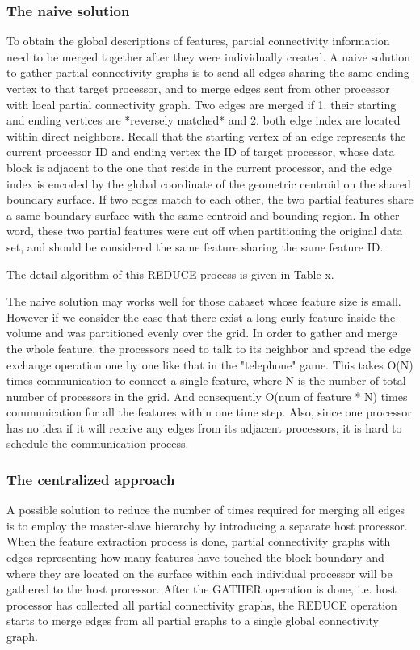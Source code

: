 \documentclass[10pt, conference, compsocconf]{IEEEtran}
\begin{document}
\subsubsection{The naive solution}

To obtain the global descriptions of features, partial connectivity information need to be merged together after they were individually created. A naive solution to gather partial connectivity graphs is to send all edges sharing the same ending vertex to that target processor, and to merge edges sent from other processor with local partial connectivity graph. Two edges are merged if 1. their starting and ending vertices are *reversely matched* and 2. both edge index are located within direct neighbors. Recall that the starting vertex of an edge represents the current processor ID and ending vertex the ID of target processor, whose data block is adjacent to the one that reside in the current processor, and the edge index is encoded by the global coordinate of the geometric centroid on the shared boundary surface. If two edges match to each other, the two partial features share a same boundary surface with the same centroid and bounding region. In other word, these two partial features were cut off when partitioning the original data set, and should be considered the same feature sharing the same feature ID.

The detail algorithm of this REDUCE process is given in Table x.

The naive solution may works well for those dataset whose feature size is small. However if we consider the case that there exist a long curly feature inside the volume and was partitioned evenly over the grid. In order to gather and merge the whole feature, the processors need to talk to its neighbor and spread the edge exchange operation one by one like that in the "telephone" game. This takes O(N) times communication to connect a single feature, where N is the number of total number of processors in the grid. And consequently O(num of feature * N) times communication for all the features within one time step. Also, since one processor has no idea if it will receive any edges from its adjacent processors, it is hard to schedule the communication process.

\subsubsection{The centralized approach}
A possible solution to reduce the number of times required for merging all edges is to employ the master-slave hierarchy by introducing a separate host processor. When the feature extraction process is done, partial connectivity graphs with edges representing how many features have touched the block boundary and where they are located on the surface within each individual processor will be gathered to the host processor. After the GATHER operation is done, i.e. host processor has collected all partial connectivity graphs, the REDUCE operation starts to merge edges from all partial graphs to a single global connectivity graph.
\end{document}
